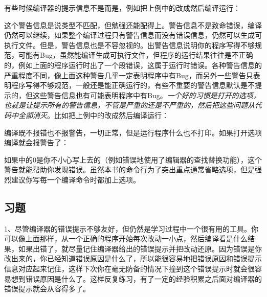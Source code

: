 有些时候编译器的提示信息不是而是，例如把上例中的改成然后编译运行：




这个警告信息是说类型不匹配，但勉强还能配得上。警告信息不是致命错误，编译仍然可以继续，如果整个编译过程只有警告信息而没有错误信息，仍然可以生成可执行文件。但是，警告信息也是不容忽视的。出警告信息说明你的程序写得不够规范，可能有Bug，虽然能编译生成可执行文件，但程序的运行结果往往是不正确的，例如上面的程序运行时出了一个段错误，这属于运行时错误。各种警告信息的严重程度不同，像上面这种警告几乎一定表明程序中有Bug，而另外一些警告只表明程序写得不够规范，一般还是能正确运行的，有些不重要的警告信息默认是不提示的，但这些警告信息也有可能表明程序中有Bug。\emph{一个好的习惯是打开的选项，也就是让提示所有的警告信息，不管是严重的还是不严重的，然后把这些问题从代码中全部消灭}。比如把上例中的改成然后编译运行：




编译既不报错也不报警告，一切正常，但是运行程序什么也不打印。如果打开选项编译就会报警告了：




如果中的0是你不小心写上去的（例如错误地使用了编辑器的查找替换功能），这个警告就能帮助你发现错误。虽然本书的命令行为了突出重点通常省略选项，但是强烈建议你写每一个编译命令时都加上选项。


\subsection*{习题}
%


1、尽管编译器的错误提示不够友好，但仍然是学习过程中一个很有用的工具。你可以像上面那样，从一个正确的程序开始每次改动一小点，然后编译看是什么结果，如果出错了，就尽量记住编译器给出的错误提示并把改动还原。因为错误是你改出来的，你已经知道错误原因是什么了，所以能很容易地把错误原因和错误提示信息对应起来记住，这样下次你在毫无防备的情况下撞到这个错误提示时就会很容易想到错误原因是什么了。这样反复练习，有了一定的经验积累之后面对编译器的错误提示就会从容得多了。

